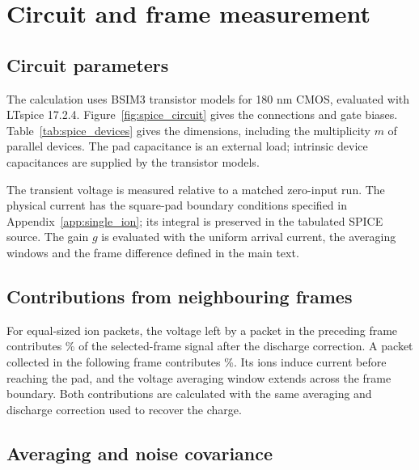 \section{Circuit and frame measurement}
\label{app:spice_readout}

\subsection{Circuit parameters}

The calculation uses BSIM3 transistor models for 180 nm CMOS, evaluated with
LTspice 17.2.4. Figure~\ref{fig:spice_circuit} gives the connections and gate
biases. Table~\ref{tab:spice_devices} gives the dimensions, including the
multiplicity $m$ of parallel devices. The pad capacitance is an external
load; intrinsic device capacitances are supplied by the transistor models.

The transient voltage is measured relative to a matched zero-input run.
The physical current has the square-pad boundary conditions specified in
Appendix~\ref{app:single_ion}; its integral is preserved in the tabulated
SPICE source. The gain $g$ is evaluated with the uniform arrival current,
the averaging windows and the frame difference defined in the main text.

\subsection{Contributions from neighbouring frames}

For equal-sized ion packets, the voltage left by a packet in the preceding
frame contributes \SpicePreviousPercent\% of the selected-frame signal
after the discharge correction. A packet collected in the following frame
contributes \SpiceFollowingPercent\%. Its ions induce current before reaching
the pad, and the voltage averaging window extends across the frame boundary.
Both contributions are calculated with the same averaging and discharge
correction used to recover the charge.

\subsection{Averaging and noise covariance}
\label{app:spice_noise}

